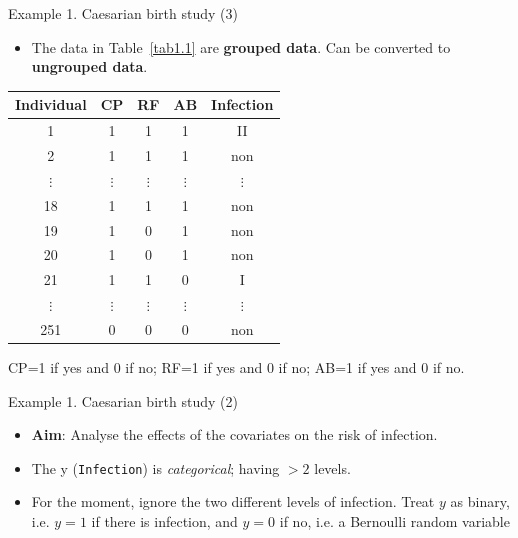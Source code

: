 \documentclass{beamer}
\newenvironment{wideitemize}%
  {\begin{itemize}%
    \setlength{\parskip}{1em}}%
  {\end{itemize}}
\begin{document}
\begin{frame}{Example 1. Caesarian birth study (3)}
\begin{itemize}
\item
The data in Table~\ref{tab1.1} are \textbf{grouped data}. Can  be converted to \textbf{ungrouped data}.
\end{itemize}

\begin{center}
\begin{tabular}{ccccc}
\hline
Individual & CP & RF & AB & Infection \\ \hline
1 & 1 & 1 & 1 & II \\
2 & 1 & 1 & 1 & non \\
$\vdots$ & $\vdots$ & $\vdots$ & $\vdots$ & $\vdots$ \\
18 & 1 & 1 & 1 & non \\
19 & 1 & 0 & 1 & non \\
20 & 1 & 0 & 1 & non \\
21 & 1 & 1 & 0 & I \\
$\vdots$ & $\vdots$ & $\vdots$ & $\vdots$ & $\vdots$ \\  
251 & 0 & 0 & 0 & non \\ \hline
\end{tabular}
\end{center}


CP=1 if yes and 0 if no; RF=1 if yes and 0 if no; AB=1 if yes and 0 if no.
\end{frame}


\begin{frame}{Example 1. Caesarian birth study (2)}
\begin{wideitemize}
\item
\textbf{Aim}: Analyse the effects of the covariates on the risk of infection.

\item
The y (\texttt{Infection}) is \emph{categorical};  having $> 2$ levels.


\item For the moment, ignore the two different levels of infection. Treat $y$ as binary, i.e. $y = 1$ if there is infection, and $y = 0$ if no, i.e. a Bernoulli random variable



\end{wideitemize}
\end{frame}
\end{document}
